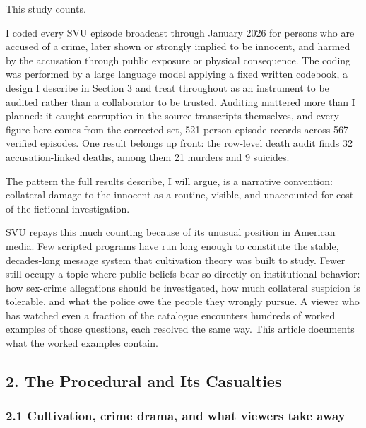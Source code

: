 \documentclass[
]{article}
\begin{document}
This study counts.

I coded every SVU episode broadcast through January 2026 for persons who
are accused of a crime, later shown or strongly implied to be innocent,
and harmed by the accusation through public exposure or physical
consequence. The coding was performed by a large language model applying
a fixed written codebook, a design I describe in Section 3 and treat
throughout as an instrument to be audited rather than a collaborator to
be trusted. Auditing mattered more than I planned: it caught corruption
in the source transcripts themselves, and every figure here comes from
the corrected set, 521 person-episode records across 567 verified
episodes. One result belongs up front: the row-level death audit finds
32 accusation-linked deaths, among them 21 murders and 9 suicides.

The pattern the full results describe, I will argue, is a narrative
convention: collateral damage to the innocent as a routine, visible, and
unaccounted-for cost of the fictional investigation.

SVU repays this much counting because of its unusual position in
American media. Few scripted programs have run long enough to constitute
the stable, decades-long message system that cultivation theory was
built to study. Fewer still occupy a topic where public beliefs bear so
directly on institutional behavior: how sex-crime allegations should be
investigated, how much collateral suspicion is tolerable, and what the
police owe the people they wrongly pursue. A viewer who has watched even
a fraction of the catalogue encounters hundreds of worked examples of
those questions, each resolved the same way. This article documents what
the worked examples contain.

\subsection{2. The Procedural and Its
Casualties}\label{the-procedural-and-its-casualties}

\subsubsection{2.1 Cultivation, crime drama, and what viewers take
away}\label{cultivation-crime-drama-and-what-viewers-take-away}
\end{document}

